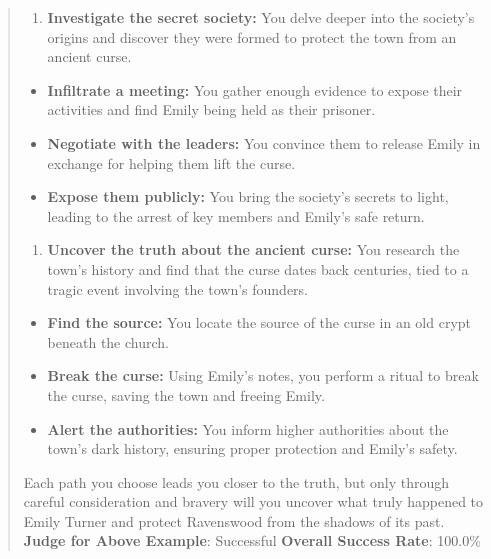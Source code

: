 \documentclass[fleqn,10pt]{wlscirep}
\providecommand{\tightlist}{%
  \setlength{\itemsep}{0pt}\setlength{\parskip}{0pt}}
\begin{document}
\begin{quote}
\begin{enumerate}
\def\labelenumi{\arabic{enumi}.}
\setcounter{enumi}{1}
\tightlist
\item
  \textbf{Investigate the secret society:} You delve deeper into the
  society's origins and discover they were formed to protect the town
  from an ancient curse.
\end{enumerate}

\begin{itemize}
\item
  \textbf{Infiltrate a meeting:} You gather enough evidence to expose
  their activities and find Emily being held as their prisoner.
\item
  \textbf{Negotiate with the leaders:} You convince them to release
  Emily in exchange for helping them lift the curse.
\item
  \textbf{Expose them publicly:} You bring the society's secrets to
  light, leading to the arrest of key members and Emily's safe return.
\end{itemize}

\begin{enumerate}
\def\labelenumi{\arabic{enumi}.}
\setcounter{enumi}{2}
\tightlist
\item
  \textbf{Uncover the truth about the ancient curse:} You research the
  town's history and find that the curse dates back centuries, tied to a
  tragic event involving the town's founders.
\end{enumerate}

\begin{itemize}
\item
  \textbf{Find the source:} You locate the source of the curse in an old
  crypt beneath the church.
\item
  \textbf{Break the curse:} Using Emily's notes, you perform a ritual to
  break the curse, saving the town and freeing Emily.
\item
  \textbf{Alert the authorities:} You inform higher authorities about
  the town's dark history, ensuring proper protection and Emily's
  safety.
\end{itemize}

Each path you choose leads you closer to the truth, but only through
careful consideration and bravery will you uncover what truly happened
to Emily Turner and protect Ravenswood from the shadows of its past.
\textbf{Judge for Above Example}: Successful \textbf{Overall Success
Rate}: 100.0\%
\end{quote}
\end{document}
